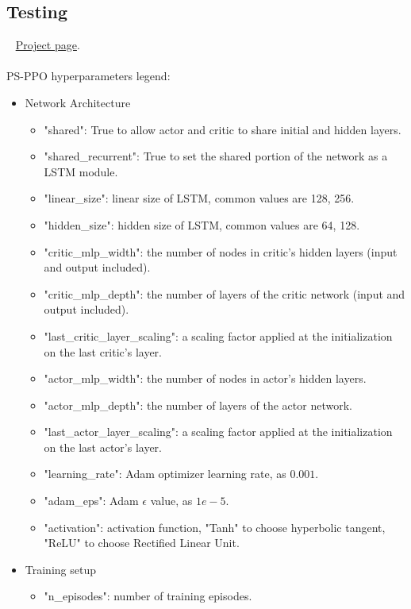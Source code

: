 \documentclass[11pt, a4paper, hidelinks]{report}
\begin{document}
\subsection{Testing}\label{subsec:testing}
~\newline
\href{https://wandb.ai/fiorenzoparascandolo/flatland-challenge-ps-ppo-test?workspace=user-fiorenzoparascandolo}{Project page}.\\
\\
PS-PPO hyperparameters legend:
\begin{itemize}
	\item Network Architecture
	\begin{itemize}
		\item "shared": True to allow actor and critic to share initial and hidden layers.
        	\item "shared\_recurrent": True to set the shared portion of the network as a LSTM module.
        	\item "linear\_size": linear size of LSTM, common values are 128, 256.
        	\item "hidden\_size": hidden size of LSTM, common values are 64, 128.
		\item "critic\_mlp\_width": the number of nodes in critic's hidden layers (input and output included).
		\item "critic\_mlp\_depth": the number of layers of the critic network (input and output included).
		\item "last\_critic\_layer\_scaling": a scaling factor applied at the initialization on the last critic's layer.
		\item "actor\_mlp\_width": the number of nodes in actor's hidden layers.
		\item "actor\_mlp\_depth": the number of layers of the actor network.
		\item "last\_actor\_layer\_scaling": a scaling factor applied at the initialization on the last actor's layer.
		\item "learning\_rate": Adam optimizer learning rate, as $0.001$.
		\item "adam\_eps": Adam $\epsilon$ value, as $1e-5$.
		\item "activation": activation function, "Tanh" to choose hyperbolic tangent, "ReLU" to choose Rectified Linear Unit.
	\end{itemize}
	\item Training setup
	\begin{itemize}
		\item "n\_episodes": number of training episodes.

\end{itemize}
\end{itemize}
\end{document}
